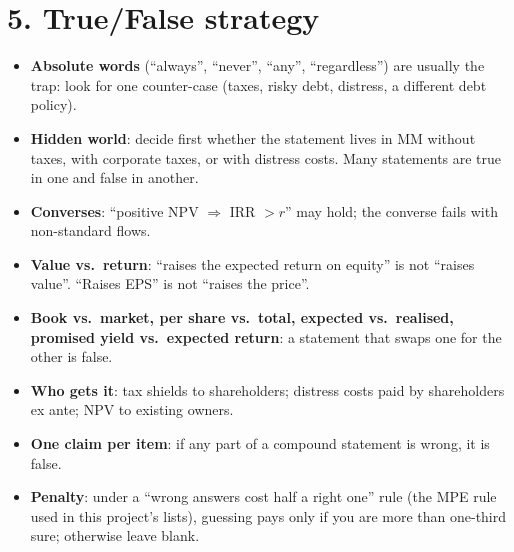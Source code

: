 \documentclass[10pt,a4paper]{article}
\begin{document}
\section*{5. True/False strategy}
\begin{itemize}
  \item \textbf{Absolute words} (``always'', ``never'', ``any'', ``regardless'') are usually the trap:
        look for one counter-case (taxes, risky debt, distress, a different debt policy).
  \item \textbf{Hidden world}: decide first whether the statement lives in MM without taxes, with
        corporate taxes, or with distress costs. Many statements are true in one and false in another.
  \item \textbf{Converses}: ``positive NPV $\Rightarrow$ IRR $>r$'' may hold; the converse fails with
        non-standard flows.
  \item \textbf{Value vs.\ return}: ``raises the expected return on equity'' is not ``raises value''.
        ``Raises EPS'' is not ``raises the price''.
  \item \textbf{Book vs.\ market, per share vs.\ total, expected vs.\ realised, promised yield vs.\
        expected return}: a statement that swaps one for the other is false.
  \item \textbf{Who gets it}: tax shields to shareholders; distress costs paid by shareholders ex ante;
        NPV to existing owners.
  \item \textbf{One claim per item}: if any part of a compound statement is wrong, it is false.
  \item \textbf{Penalty}: under a ``wrong answers cost half a right one'' rule (the MPE rule used in this
        project's lists), guessing pays only if you are more than one-third sure; otherwise leave blank.
\end{itemize}

\end{document}
